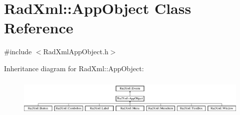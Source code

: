 \hypertarget{class_rad_xml_1_1_app_object}{\section{Rad\-Xml\-:\-:App\-Object Class Reference}
\label{class_rad_xml_1_1_app_object}
}


{\ttfamily \#include $<$Rad\-Xml\-App\-Object.\-h$>$}

Inheritance diagram for Rad\-Xml\-:\-:App\-Object\-:\begin{figure}[H]
\begin{center}
\leavevmode
\includegraphics[height=1.860465cm]{class_rad_xml_1_1_app_object}
\end{center}
\end{figure}
